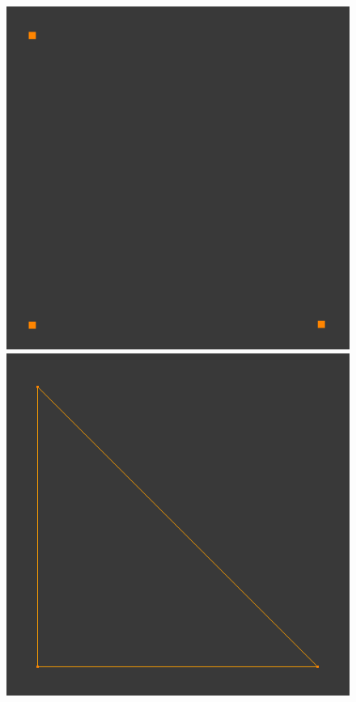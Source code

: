 \begin{figure}[!htb]
    \includegraphics[width=\linewidth]{tex/img/ch03/Basics01_Vertices.png}
    \label{fig:3d-vertices}
\endminipage\hfill
{}
    \includegraphics[width=\linewidth]{tex/img/ch03/Basics02_Edges.png}

\end{figure}
